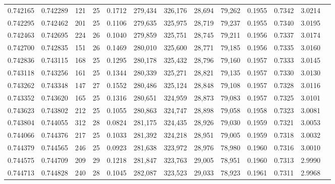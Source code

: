 \begin{tabular}{rrrrrrrrrrrrr}
0.742165 & 0.742289 &   121 &  25 &                                     0.1712 & 279,434 & 326,176 &  28,694 &  79,262 & 0.1955 & 0.7342 & 3.0214 \\
0.742295 & 0.742462 &   201 &  25 &                                     0.1106 & 279,635 & 325,975 &  28,719 &  79,237 & 0.1955 & 0.7340 & 3.0195 \\
0.742463 & 0.742695 &   224 &  26 &                                     0.1040 & 279,859 & 325,751 &  28,745 &  79,211 & 0.1956 & 0.7337 & 3.0174 \\
0.742700 & 0.742835 &   151 &  26 &                                     0.1469 & 280,010 & 325,600 &  28,771 &  79,185 & 0.1956 & 0.7335 & 3.0160 \\
0.742836 & 0.743115 &   168 &  25 &                                     0.1295 & 280,178 & 325,432 &  28,796 &  79,160 & 0.1957 & 0.7333 & 3.0145 \\
0.743118 & 0.743256 &   161 &  25 &                                     0.1344 & 280,339 & 325,271 &  28,821 &  79,135 & 0.1957 & 0.7330 & 3.0130 \\
0.743262 & 0.743348 &   147 &  27 &                                     0.1552 & 280,486 & 325,124 &  28,848 &  79,108 & 0.1957 & 0.7328 & 3.0116 \\
0.743352 & 0.743620 &   165 &  25 &                                     0.1316 & 280,651 & 324,959 &  28,873 &  79,083 & 0.1957 & 0.7325 & 3.0101 \\
0.743623 & 0.743802 &   212 &  25 &                                     0.1055 & 280,863 & 324,747 &  28,898 &  79,058 & 0.1958 & 0.7323 & 3.0081 \\
0.743804 & 0.744055 &   312 &  28 &                                     0.0824 & 281,175 & 324,435 &  28,926 &  79,030 & 0.1959 & 0.7321 & 3.0053 \\
0.744066 & 0.744376 &   217 &  25 &                                     0.1033 & 281,392 & 324,218 &  28,951 &  79,005 & 0.1959 & 0.7318 & 3.0032 \\
0.744379 & 0.744565 &   246 &  25 &                                     0.0923 & 281,638 & 323,972 &  28,976 &  78,980 & 0.1960 & 0.7316 & 3.0010 \\
0.744575 & 0.744709 &   209 &  29 &                                     0.1218 & 281,847 & 323,763 &  29,005 &  78,951 & 0.1960 & 0.7313 & 2.9990 \\
0.744713 & 0.744828 &   240 &  28 &                                     0.1045 & 282,087 & 323,523 &  29,033 &  78,923 & 0.1961 & 0.7311 & 2.9968 \\

\end{tabular}

